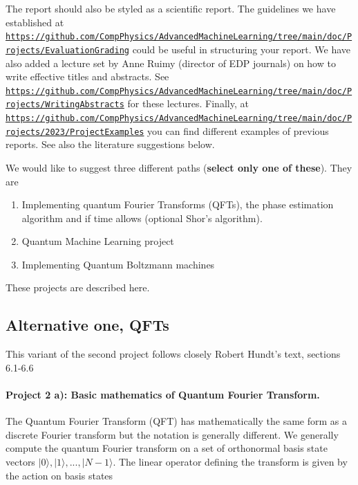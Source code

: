 \documentclass[%
oneside,                 %
final,                   %
10pt]{article}
\begin{document}
The report should also be styled as a scientific report. The guidelines
we have established at
\href{{https://github.com/CompPhysics/AdvancedMachineLearning/tree/main/doc/Projects/EvaluationGrading}}{\nolinkurl{https://github.com/CompPhysics/AdvancedMachineLearning/tree/main/doc/Projects/EvaluationGrading}}
could be useful in structuring your report. We have also added a
lecture set by Anne Ruimy (director of EDP journals) on how to write
effective titles and abstracts. See
\href{{https://github.com/CompPhysics/AdvancedMachineLearning/tree/main/doc/Projects/WritingAbstracts}}{\nolinkurl{https://github.com/CompPhysics/AdvancedMachineLearning/tree/main/doc/Projects/WritingAbstracts}}
for these lectures. Finally, at
\href{{https://github.com/CompPhysics/AdvancedMachineLearning/tree/main/doc/Projects/2023/ProjectExamples}}{\nolinkurl{https://github.com/CompPhysics/AdvancedMachineLearning/tree/main/doc/Projects/2023/ProjectExamples}}
you can find different examples of previous reports. See also the literature suggestions below.

We would like to suggest three different paths (\textbf{select only one of these}). They are

\begin{enumerate}
\item Implementing quantum Fourier Transforms (QFTs), the phase estimation algorithm and if time allows (optional Shor's algorithm).

\item Quantum Machine Learning project

\item Implementing Quantum Boltzmann machines
\end{enumerate}

\noindent
These projects are described here.

\subsection{Alternative one, QFTs}

This variant of the second project follows closely Robert Hundt's text, sections 6.1-6.6

\paragraph{Project 2 a): Basic mathematics of  Quantum Fourier Transform.}
The Quantum Fourier Transform (QFT) has mathematically the same form as a discrete Fourier transform
but the notation is generally different. We generally compute the
quantum Fourier transform on a set of orthonormal basis state vectors
\(|0\rangle, |1\rangle, ..., |N-1\rangle\). The linear operator defining
the transform is given by the action on basis states
\end{document}
